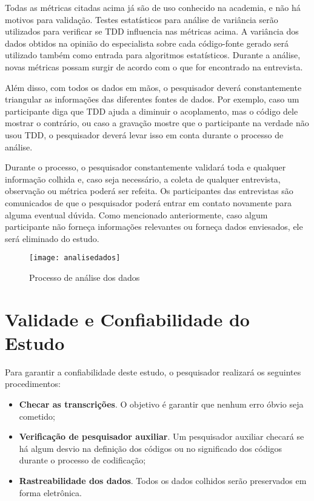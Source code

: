 Todas as métricas citadas acima já são de uso conhecido na academia, e não há 
motivos para validação. Testes estatísticos para análise de variância serão utilizados
para verificar se TDD influencia nas métricas acima.
A variância dos dados obtidos na opinião do especialista sobre cada código-fonte gerado
será utilizado também como entrada para algoritmos estatísticos. 
Durante a análise, novas
métricas possam surgir de acordo com o que for encontrado na entrevista.

Além disso, com todos os dados em mãos, o pesquisador deverá constantemente triangular
as informações das diferentes fontes de dados. Por exemplo, caso um participante diga
que TDD ajuda a diminuir o acoplamento, mas o código dele mostrar o contrário, ou caso
a gravação mostre que o participante na verdade não usou TDD, o pesquisador
deverá levar isso em conta durante o processo de análise.

Durante o processo, o pesquisador constantemente validará toda e qualquer
informação colhida e, caso seja necessário, a coleta de qualquer entrevista,
observação ou métrica poderá ser refeita. Os participantes das entrevistas
são comunicados de que o pesquisador poderá entrar em contato
novamente para alguma eventual dúvida.
Como mencionado anteriormente, caso algum participante não forneça informações
relevantes ou forneça dados enviesados, ele será eliminado do estudo.

\begin{figure}
  \centering
  \texttt{[image: analisedados]}
  \caption{Processo de análise dos dados}
  \label{fig:analise-dados}
\end{figure}

\section{Validade e Confiabilidade do Estudo}
\label{sec:planejamento-validacao}

Para garantir a confiabilidade deste estudo, o pesquisador realizará os
seguintes procedimentos:

\begin{itemize}
	\item \textbf{Checar as transcrições}. O objetivo é garantir que nenhum erro
	óbvio seja cometido;

	\item \textbf{Verificação de pesquisador auxiliar}. Um pesquisador auxiliar
	checará se há algum desvio na definição dos códigos ou no significado dos códigos 
	durante o processo de codificação;
	
	\item \textbf{Rastreabilidade dos dados}. Todos os dados colhidos serão
	preservados em forma eletrônica.

\end{itemize}

